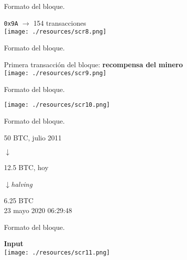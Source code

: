 \documentclass[10pt, xcolor=table]{beamer}
\begin{document}
\begin{frame}{Formato del bloque. }
\begin{center}
\texttt{0x9A} $\longrightarrow$ 154 transacciones\\
\hspace{1cm}
	\texttt{[image: ./resources/scr8.png]}
\end{center}	
\end{frame}

\begin{frame}{Formato del bloque. }
\begin{center}
Primera transacción del bloque: \textbf{recompensa del minero}\\
\hspace{1cm}
	\texttt{[image: ./resources/scr9.png]}
\end{center}	
\end{frame}

\begin{frame}{Formato del bloque. }
\begin{center}
	\texttt{[image: ./resources/scr10.png]}
\end{center}	
\end{frame}

\begin{frame}{Formato del bloque. }
\begin{center}
\vspace{0.5cm}
	\huge{50 BTC}\large{, julio 2011}
	
	\huge{$\downarrow$}
	
	\vspace{0.3cm}
	
	\huge{12.5 BTC}\large{, hoy}

	\vspace{0.3cm}	
	
	\hspace{0.2cm}\large{}\huge{$\downarrow$}\hspace{0.2cm}\large{\emph{halving}}
	
	\vspace{0.3cm}
	
	\huge{6.25 BTC}\\\large{23 mayo 2020 06:29:48}
\end{center}	
\end{frame}

\begin{frame}{Formato del bloque. }
\begin{center}
\Large{\textbf{Input}}\\
\hspace{1cm}
	\texttt{[image: ./resources/scr11.png]}
\end{center}	
\end{frame}
\end{document}
